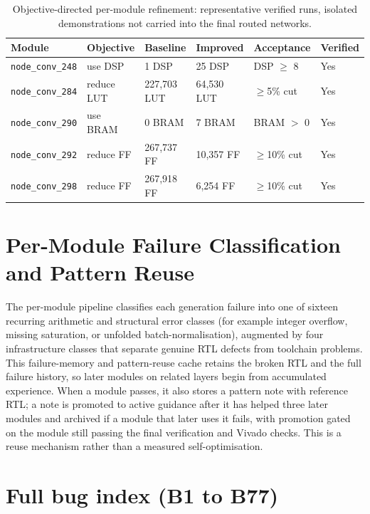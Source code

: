 \begin{table}[t]
\centering
\caption{Objective-directed per-module refinement: representative verified runs, isolated demonstrations not carried into the final routed networks.}
\label{tab:improve}
\footnotesize
\begin{tabular}{@{}llllll@{}}
\toprule
Module & Objective & Baseline & Improved & Acceptance & Verified \\
\midrule
\texttt{node\_conv\_248} & use DSP & 1 DSP & 25 DSP & DSP $\geq$ 8 & Yes \\
\texttt{node\_conv\_284} & reduce LUT & 227,703 LUT & 64,530 LUT & $\geq$5\% cut & Yes \\
\texttt{node\_conv\_290} & use BRAM & 0 BRAM & 7 BRAM & BRAM $>$ 0 & Yes \\
\texttt{node\_conv\_292} & reduce FF & 267,737 FF & 10,357 FF & $\geq$10\% cut & Yes \\
\texttt{node\_conv\_298} & reduce FF & 267,918 FF & 6,254 FF & $\geq$10\% cut & Yes \\
\bottomrule
\end{tabular}
\end{table}

\section{Per-Module Failure Classification and Pattern Reuse}\label{app:selfimprove}

The per-module pipeline classifies each generation failure into one of sixteen recurring arithmetic and structural error classes (for example integer overflow, missing saturation, or unfolded batch-normalisation), augmented by four infrastructure classes that separate genuine RTL defects from toolchain problems. This failure-memory and pattern-reuse cache retains the broken RTL and the full failure history, so later modules on related layers begin from accumulated experience. When a module passes, it also stores a pattern note with reference RTL; a note is promoted to active guidance after it has helped three later modules and archived if a module that later uses it fails, with promotion gated on the module still passing the final verification and Vivado checks. This is a reuse mechanism rather than a measured self-optimisation.

\onecolumn
\section{Full bug index (B1 to B77)}\label{app:bugindex}

